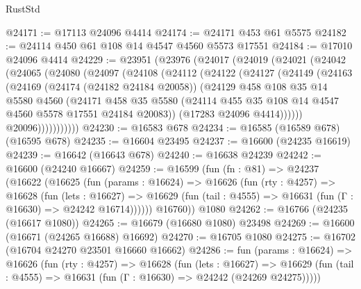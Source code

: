 \begin{lexlean}{RustStd}
\begin{coremodule}
@24171 := @17113 @24096 @4414
@24174 := @24171 @453 @61 @5575
@24182 := @24114 @450 @61 @108 @14 @4547 @4560 @5573 @17551
@24184 := @17010 @24096 @4414
@24229 := @23951
    (@23976
      (@24017
        (@24019
          (@24021
            (@24042
              (@24065
                (@24080
                  (@24097
                    (@24108
                      (@24112
                        (@24122
                          (@24127
                            (@24149
                              (@24163
                                (@24169
                                  (@24174 (@24182 @24184 @20058))
                                  (@24129
                                    @458
                                    @108
                                    @35
                                    @14
                                    @5580
                                    @4560
                                    (@24171
                                      @458
                                      @35
                                      @5580
                                      (@24114
                                        @455
                                        @35
                                        @108
                                        @14
                                        @4547
                                        @4560
                                        @5578
                                        @17551
                                        @24184
                                        @20083))
                                    (@17283 @24096 @4414))))))
                          @20096)))))))))))
@24230 := @16583 @678
@24234 := @16585 (@16589 @678) (@16595 @678)
@24235 := @16604 @23495
@24237 := @16600 (@24235 @16619)
@24239 := @16642 (@16643 @678)
@24240 := @16638 @24239
@24242 := @16600 (@24240 @16667)
@24259 := @16599
    (fun (fn : @81) =>
    @24237
      (@16622
        (@16625
          (fun (params : @16624) =>
          @16626
            (fun (rty : @4257) =>
            @16628
              (fun (lets : @16627) =>
              @16629 (fun (tail : @4555) => @16631 (fun (Γ : @16630) => @24242 @16714))))))
        @16760))
    @1080
@24262 := @16766 (@24235 (@16617 @1080))
@24265 := @16679 (@16680 @1080) @23498
@24269 := @16600 (@16671 (@24265 @16688) @16692)
@24270 := @16705 @1080
@24275 := @16702 (@16704 @24270 @23501 @16660 @16662)
@24286 := fun (params : @16624) =>
  @16626
    (fun (rty : @4257) =>
    @16628
      (fun (lets : @16627) =>
      @16629 (fun (tail : @4555) => @16631 (fun (Γ : @16630) => @24242 (@24269 @24275)))))

\end{coremodule}
\end{lexlean}
